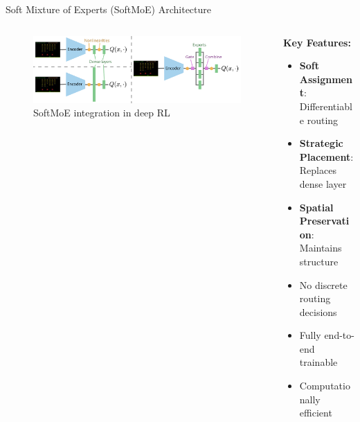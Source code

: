 \documentclass{beamer}
\begin{document}
\begin{frame}{Soft Mixture of Experts (SoftMoE) Architecture}
  \begin{columns}[T]
    \begin{column}{0.55\textwidth}
      \begin{figure}
        \centering
        \includegraphics[width=\textwidth]{Mixtures_of_Experts_Unlock Parameter_Scaling_for_Deep_RL/figures/moeArchitecture.pdf}
        \caption{SoftMoE integration in deep RL}
      \end{figure}
    \end{column}
    \begin{column}{0.45\textwidth}
      \textbf{Key Features:}
      \begin{itemize}
        \item \textbf{Soft Assignment}: Differentiable routing
        \item \textbf{Strategic Placement}: Replaces dense layer
        \item \textbf{Spatial Preservation}: Maintains structure
        \item No discrete routing decisions
        \item Fully end-to-end trainable
        \item Computationally efficient
      \end{itemize}
    \end{column}
  \end{columns}
\end{frame}
\end{document}
